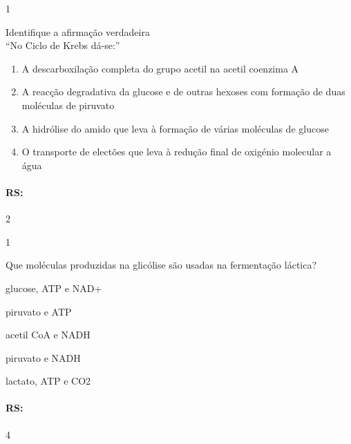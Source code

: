\documentclass[\mainfilename]{subfiles}
\begin{document}
\begin{questionBox}1{}
    
    Identifique a afirmação verdadeira\\

    ``No Ciclo de Krebs dá-se:''
    \begin{enumerate}
        \item A descarboxilação completa do grupo acetil na acetil coenzima A 
        \item A reacção degradativa da glucose e de outras hexoses com formação de duas moléculas de piruvato
        \item A hidrólise do amido que leva à formação de várias  moléculas de glucose 
        \item O transporte de electões que leva à redução final de oxigénio molecular a água 
    \end{enumerate}

    \paragraph{RS:} 2
    
\end{questionBox}

\begin{questionBox}1{}
    
    Que moléculas produzidas na glicólise são usadas na fermentação láctica? 
    \begin{enumerate}
        \begin{multicols}{2}
            \item glucose, ATP e  NAD+
            \item piruvato e  ATP
            \item acetil CoA e NADH
            \item piruvato e NADH 
            \item lactato, ATP e  CO2
        \end{multicols}
    \end{enumerate}

    \paragraph{RS:} 4
    
\end{questionBox}
\end{document}
